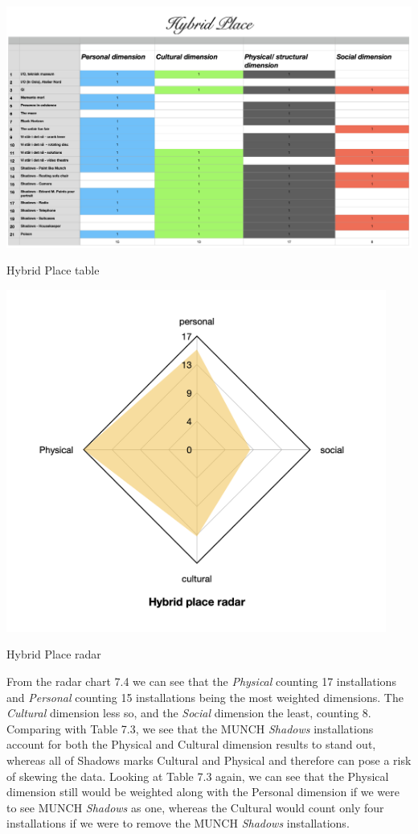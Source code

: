 \begin{table}[H]
    \centering 
    \includegraphics[width=20cm, angle=90]{pictures/analysis/hybrid.png}
    \caption{Hybrid Place table}
\end{table}

\begin{table}[H]
    \centering 
    \includegraphics[width=12.5cm]{pictures/analysis/hybrid_radar.png}
    \caption{Hybrid Place radar}
\end{table}


From the radar chart 7.4 we can see that the \textit{Physical} counting 17 installations and \textit{Personal} counting 15 installations being the most weighted dimensions. The \textit{Cultural} dimension less so, and the \textit{Social} dimension the least, counting 8. Comparing with Table 7.3, we see that the MUNCH \textit{Shadows} installations account for both the Physical and Cultural dimension results to stand out, whereas all of Shadows marks Cultural and Physical and therefore can pose a risk of skewing the data. Looking at Table 7.3 again, we can see that the Physical dimension still would be weighted along with the Personal dimension if we were to see MUNCH \textit{Shadows} as one, whereas the Cultural would count only four installations if we were to remove the MUNCH \emph{Shadows} installations.

